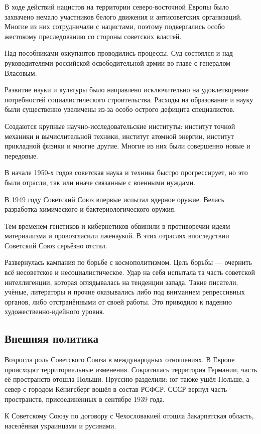 \documentclass{article}
\begin{document}
В ходе действий нацистов на территории северо-восточной Европы было захвачено немало участников белого движения и антисоветских организаций. Многие из них сотрудничали с нацистами, поэтому подвергались особо жестокому преследованию со стороны советских властей.

Над пособниками оккупантов проводились процессы. Суд состоялся и над руководителями российской освободительной армии во главе с генералом Власовым.

Развитие науки и культуры было направлено исключительно на удовлетворение потребностей социалистического строительства. Расходы на образование и науку были существенно увеличены из-за особо острого дефицита специалистов.

Создаются крупные научно-исследовательские институты: институт точной механики и вычислительной техники, институт атомной энергии, институт прикладной физики и многие другие. Многие из них были совершенно новые и передовые.

В начале 1950-х годов советская наука и техника быстро прогрессирует, но это были отрасли, так или иначе связанные с военными нуждами.

В 1949 году Советский Союз впервые испытал ядерное оружие. Велась разработка химического и бактериологического оружия.

Тем временем генетиков и кибернетиков обвинили в противоречии идеям материализма и провозгласили лженаукой. В этих отраслях впоследствии Советский Союз серьёзно отстал.

Развернулась кампания по борьбе с космополитизмом. Цель борьбы --- очернить всё несоветское и несоциалистическое. Удар на себя испытала та часть советской интеллигенции, которая оглядывалась на тенденции запада. Такие писатели, учёные, литераторы и прочие оказывались либо под вниманием репрессивных органов, либо отстранёнными от своей работы. Это приводило к падению художественно-идейного уровня.

\subsection{Внешняя политика}
Возросла роль Советского Союза в международных отношениях. В Европе происходят территориальные изменения. Сократилась территория Германии, часть её пространств отошла Польши. Пруссию разделили: юг также ушёл Польше, а север с городом Кёнигсберг вошёл в состав РСФСР. СССР вернул часть пространств, присоединённых в сентябре 1939 года.

К Советскому Союзу по договору с Чехословакией отошла Закарпатская область, населённая украинцами и русинами.
\end{document}
